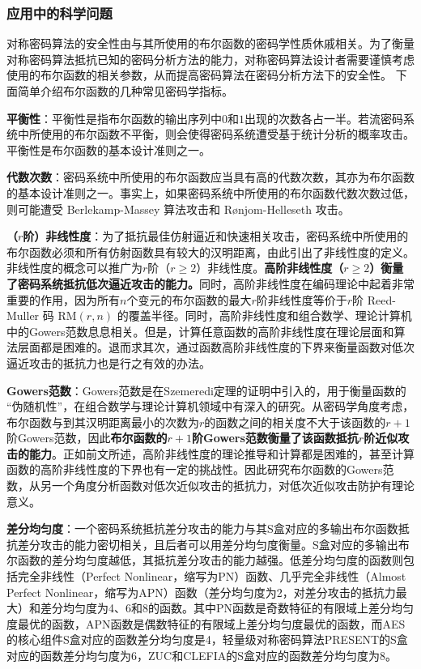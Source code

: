\documentclass[a4paper,zihao=-4,AutoFakeBold]{ctexart}
\begin{document}
\subsubsection{应用中的科学问题}
对称密码算法的安全性由与其所使用的布尔函数的密码学性质休戚相关。为了衡量对称密码算法抵抗已知的密码分析方法的能力，对称密码算法设计者需要谨慎考虑使用的布尔函数的相关参数，从而提高密码算法在密码分析方法下的安全性。
下面简单介绍布尔函数的几种常见密码学指标。

    \textbf{平衡性}：平衡性是指布尔函数的输出序列中$0$和$1$出现的次数各占一半。若流密码系统中所使用的布尔函数不平衡，则会使得密码系统遭受基于统计分析的概率攻击。平衡性是布尔函数的基本设计准则之一。

    \textbf{代数次数}：密码系统中所使用的布尔函数应当具有高的代数次数，其亦为布尔函数的基本设计准则之一。事实上，如果密码系统中所使用的布尔函数代数次数过低，则可能遭受 Berlekamp-Massey 算法攻击和 Rønjom-Helleseth 攻击。

    \textbf{（$r$阶）非线性度}：为了抵抗最佳仿射逼近和快速相关攻击，密码系统中所使用的布尔函数必须和所有仿射函数具有较大的汉明距离，由此引出了非线性度的定义。非线性度的概念可以推广为$r$阶（$r\ge 2$）非线性度。\textbf{高阶非线性度（$r\ge 2$）衡量了密码系统抵抗低次逼近攻击的能力。}同时，高阶非线性度在编码理论中起着非常重要的作用，因为所有$n$个变元的布尔函数的最大$r$阶非线性度等价于$r$阶 Reed-Muller 码 $\mathrm{RM}(r, n)$ 的覆盖半径。同时，高阶非线性度和组合数学、理论计算机中的Gowers范数息息相关。但是，计算任意函数的高阶非线性度在理论层面和算法层面都是困难的。退而求其次，通过函数高阶非线性度的下界来衡量函数对低次逼近攻击的抵抗力也是行之有效的办法。
    
    \textbf{Gowers范数}：Gowers范数是在Szemeredi定理的证明中引入的，用于衡量函数的 ``伪随机性''，在组合数学与理论计算机领域中有深入的研究。从密码学角度考虑，布尔函数与到其汉明距离最小的次数为$r$的函数之间的相关度不大于该函数的$r+1$阶Gowers范数，因此\textbf{布尔函数的$r+1$阶Gowers范数衡量了该函数抵抗$r$阶近似攻击的能力}。正如前文所述，高阶非线性度的理论推导和计算都是困难的，甚至计算函数的高阶非线性度的下界也有一定的挑战性。因此研究布尔函数的Gowers范数，从另一个角度分析函数对低次近似攻击的抵抗力，对低次近似攻击防护有理论意义。

    \textbf{差分均匀度}：一个密码系统抵抗差分攻击的能力与其S盒对应的多输出布尔函数抵抗差分攻击的能力密切相关，且后者可以用差分均匀度衡量。S盒对应的多输出布尔函数的差分均匀度越低，其抵抗差分攻击的能力越强。低差分均匀度的函数则包括完全非线性（Perfect Nonlinear，缩写为PN）函数、几乎完全非线性（Almost Perfect Nonlinear，缩写为APN）函数（差分均匀度为2，对差分攻击的抵抗力最大）和差分均匀度为4、6和8的函数。其中PN函数是奇数特征的有限域上差分均匀度最优的函数，APN函数是偶数特征的有限域上差分均匀度最优的函数，而AES的核心组件S盒对应的函数差分均匀度是4，轻量级对称密码算法PRESENT的S盒对应的函数差分均匀度为6，ZUC和CLEFIA的S盒对应的函数差分均匀度为8。
\end{document}
